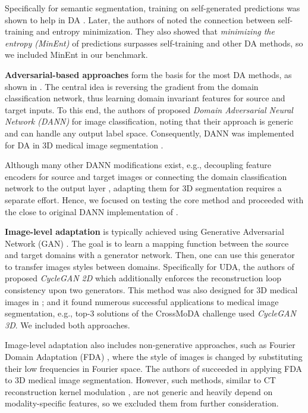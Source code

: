 Specifically for semantic segmentation, training on self-generated predictions was shown to help in DA \cite{self_training}. Later, the authors of \cite{entropy} noted the connection between self-training and entropy minimization. They also showed that \textit{minimizing the entropy (MinEnt)} of predictions surpasses self-training and other DA methods, so we included MinEnt in our benchmark.


\textbf{Adversarial-based approaches} form the basis for the most DA methods, as shown in \cite{uda_segm_review_2020}. The central idea is reversing the gradient from the domain classification network, thus learning domain invariant features for source and target inputs. To this end, the authors of \cite{dann} proposed \textit{Domain Adversarial Neural Network (DANN)} for image classification, noting that their approach is generic and can handle any output label space. Consequently, DANN was implemented for DA in 3D medical image segmentation \cite{dann_medim}.

Although many other DANN modifications exist, e.g., decoupling feature encoders for source and target images \cite{adda} or connecting the domain classification network to the output layer \cite{tsai2018learning}, adapting them for 3D segmentation requires a separate effort. Hence, we focused on testing the core method and proceeded with the close to original DANN implementation of \cite{dann_medim}.


\textbf{Image-level adaptation} is typically achieved using Generative Adversarial Network (GAN) \cite{goodfellow2020generative}. The goal is to learn a mapping function between the source and target domains with a generator network. Then, one can use this generator to transfer images styles between domains. Specifically for UDA, the authors of \cite{cyclegan} proposed \textit{CycleGAN 2D} which additionally enforces the reconstruction loop consistency upon two generators. This method was also designed for 3D medical images in \cite{cyclegan3d}; and it found numerous successful applications to medical image segmentation, e.g., top-3 solutions of the CrossMoDA challenge \cite{crossmoda} used \textit{CycleGAN 3D}. We included both approaches.

Image-level adaptation also includes non-generative approaches, such as Fourier Domain Adaptation (FDA) \cite{fda}, where the style of images is changed by substituting their low frequencies in Fourier space. The authors of \cite{fda_medim} succeeded in applying FDA to 3D medical image segmentation. However, such methods, similar to CT reconstruction kernel modulation \cite{saparov2021zero}, are not generic and heavily depend on modality-specific features, so we excluded them from further consideration.


